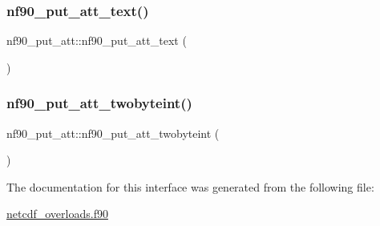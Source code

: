 \subsubsection{\texorpdfstring{nf90\+\_\+put\+\_\+att\+\_\+text()}{nf90\_put\_att\_text()}}
{\footnotesize\ttfamily nf90\+\_\+put\+\_\+att\+::nf90\+\_\+put\+\_\+att\+\_\+text (\begin{DoxyParamCaption}{ }\end{DoxyParamCaption})}

\mbox{\label{interfacenf90__put__att_aa86c5294d555f3cfed3ad281f8175397}} 
\subsubsection{\texorpdfstring{nf90\+\_\+put\+\_\+att\+\_\+twobyteint()}{nf90\_put\_att\_twobyteint()}}
{\footnotesize\ttfamily nf90\+\_\+put\+\_\+att\+::nf90\+\_\+put\+\_\+att\+\_\+twobyteint (\begin{DoxyParamCaption}{ }\end{DoxyParamCaption})}



The documentation for this interface was generated from the following file\+:\begin{DoxyCompactItemize}
\item 
\hyperlink{netcdf__overloads_8f90}{netcdf\+\_\+overloads.\+f90}\end{DoxyCompactItemize}
